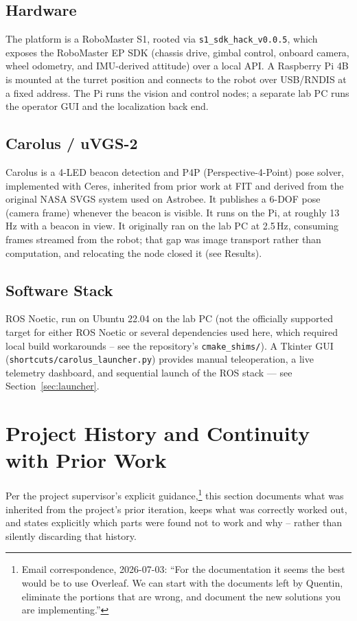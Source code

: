 \documentclass[11pt]{article}
\begin{document}
\subsection{Hardware}
The platform is a RoboMaster S1, rooted via \texttt{s1\_sdk\_hack\_v0.0.5},
which exposes the RoboMaster EP SDK (chassis drive, gimbal control, onboard
camera, wheel odometry, and IMU-derived attitude) over a local API. A
Raspberry Pi 4B is mounted at the turret position and connects to the robot
over USB/RNDIS at a fixed address. The Pi runs the vision and control nodes;
a separate lab PC runs the operator GUI and the localization back end.

\subsection{Carolus / uVGS-2}
Carolus is a 4-LED beacon detection and P4P (Perspective-4-Point) pose
solver, implemented with Ceres, inherited from prior work at FIT and derived
from the original NASA SVGS system used on Astrobee. It publishes a 6-DOF
pose (camera frame) whenever the beacon is visible. It runs on the Pi, at
roughly 13\,Hz with a beacon in view. It originally ran on the lab PC at
2.5\,Hz, consuming frames streamed from the robot; that gap was image
transport rather than computation, and relocating the node closed it (see
Results).

\subsection{Software Stack}
ROS Noetic, run on Ubuntu 22.04 on the lab PC (not the officially supported
target for either ROS Noetic or several dependencies used here, which
required local build workarounds -- see the repository's \texttt{cmake\_shims/}).
A Tkinter GUI (\texttt{shortcuts/carolus\_launcher.py}) provides manual
teleoperation, a live telemetry dashboard, and sequential launch of the ROS
stack --- see Section~\ref{sec:launcher}.

\section{Project History and Continuity with Prior Work}
\label{sec:history}

Per the project supervisor's explicit guidance,\footnote{Email correspondence,
2026-07-03: ``For the documentation it seems the best would be to use
Overleaf. We can start with the documents left by Quentin, eliminate the
portions that are wrong, and document the new solutions you are
implementing.''} this section documents what was inherited from the
project's prior iteration, keeps what was correctly worked out, and states
explicitly which parts were found not to work and why -- rather than
silently discarding that history.
\end{document}
